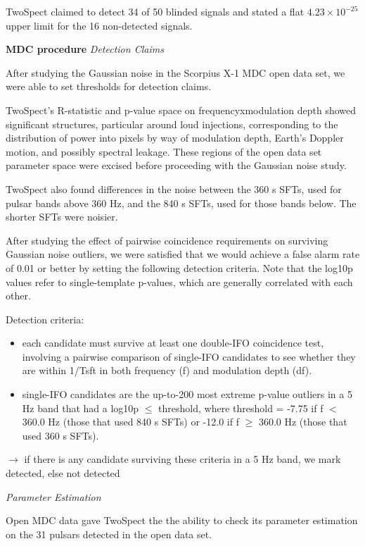 TwoSpect claimed to detect 34 of 50 blinded signals and stated a flat
$4.23 \times 10^{-25}$ upper limit for the 16 non-detected signals. 


\textbf{MDC procedure}
\newline
\textit{Detection Claims}

After studying the Gaussian noise in the Scorpius X-1 MDC open data set, we were able to set thresholds for detection claims.

TwoSpect's R-statistic and p-value space on {frequency}x{modulation depth} showed significant structures, particular around loud injections, corresponding to the distribution of power into pixels by way of modulation depth, Earth's Doppler motion, and possibly spectral leakage. These regions of the open data set parameter space were excised before proceeding with the Gaussian noise study.

TwoSpect also found differences in the noise between the 360 s SFTs, used for pulsar bands above 360 Hz, and the 840 s SFTs, used for those bands below. The shorter SFTs were noisier.

After studying the effect of pairwise coincidence requirements on surviving Gaussian noise outliers, we were satisfied that we would achieve a false alarm rate of 0.01 or better by setting the following detection criteria. Note that the log10p values refer to single-template p-values, which are generally correlated with each other.

Detection criteria:

\begin{itemize}
\item each candidate must survive at least one double-IFO coincidence test, involving a pairwise comparison of single-IFO candidates to see whether they are within 1/Tsft in both frequency (f) and modulation depth (df).
\item single-IFO candidates are the up-to-200 most extreme p-value outliers in a 5 Hz band that had a log10p $\leq$ threshold, where threshold = -7.75 if f $<$ 360.0 Hz (those that used 840 s SFTs) or -12.0 if f $\geq$ 360.0 Hz (those that used 360 s SFTs).
\end{itemize}

$\rightarrow$ if there is any candidate surviving these criteria in a 5 Hz band, we mark detected, else not detected

\textit{Parameter Estimation}

Open MDC data gave TwoSpect the the ability to check its parameter estimation on the 31 pulsars detected in the open data set.

